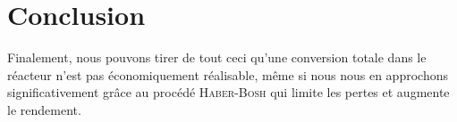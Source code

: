 \section{Conclusion} Finalement, nous pouvons tirer de tout ceci qu'une conversion totale dans le réacteur n'est
pas économiquement réalisable, même si nous nous en approchons significativement grâce au procédé \textsc{Haber-Bosh}
qui limite les pertes et augmente le rendement.
